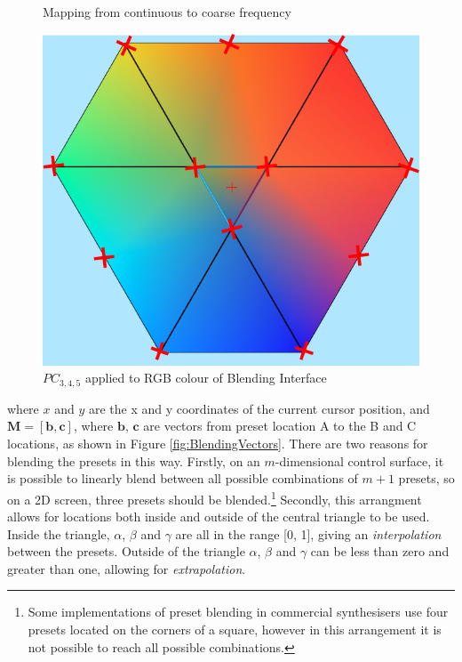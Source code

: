 \documentclass[11pt, oneside]{report}   	%
\renewcommand{\vec}[1]{\mathbf{#1}}
\begin{document}
\begin{figure}
	\caption{Mapping from continuous to coarse frequency}
	\label{fig:Freq Coarse}
	\includegraphics[width = \textwidth/3]{BlendingColours2.png}
	\caption{$PC_{3,4,5}$ applied to RGB colour of Blending Interface}
	\label{fig:BlendingColours}
	\vspace{-30pt}
\end{figure}
where $x$ and $y$ are the x and y coordinates of the current cursor position, and $\vec{M} =[\vec{b},  \vec{c}]$, where $\vec{b}$,  $\vec{c}$ are vectors from preset location A to the B and C locations, as shown in Figure \ref{fig:BlendingVectors}. There are two reasons for blending the presets in this way. Firstly, on an $m$-dimensional control surface, it is possible to linearly blend between all possible combinations of $m+1$ presets, so on a 2D screen, three presets should be blended.\footnote{Some implementations of preset blending in commercial synthesisers use four presets located on the corners of a square, however in this arrangement it is not possible to reach all possible combinations.} Secondly, this arrangment allows for locations both inside and outside of the central triangle to be used. Inside the triangle, $\alpha$, $\beta$ and $\gamma$ are all in the range [0, 1], giving an \emph{interpolation} between the presets. Outside of the triangle $\alpha$, $\beta$ and $\gamma$ can be less than zero and greater than one, allowing for \emph{extrapolation}.
\end{document}
